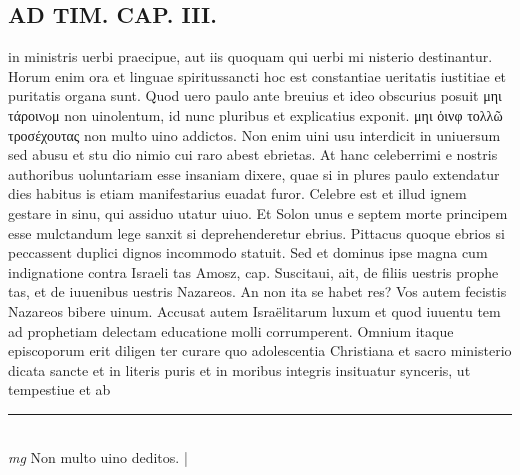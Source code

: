 \documentclass{article}
\begin{document}
\begin{pages}
\section*{AD TIM. CAP. III. }
\marginpar{[ p.131 ]}\pstart in ministris uerbi praecipue, aut iis quoquam qui uerbi mi nisterio destinantur. Horum enim ora et linguae spiritussancti hoc est constantiae ueritatis iustitiae et puritatis organa sunt. Quod uero paulo ante breuius et ideo obscurius posuit μηι τάροινoμ non uinolentum, id nunc pluribus et explicatius exponit. μηι ὁινφ τολλῶ τροσέχουτας non multo uino addictos. Non enim uini usu interdicit in uniuersum sed abusu et stu dio nimio cui raro abest ebrietas. At hanc celeberrimi e nostris authoribus uoluntariam esse insaniam dixere, quae si in plures paulo extendatur dies habitus is etiam manifestarius euadat furor. Celebre est et illud ignem gestare in sinu, qui assiduo utatur uiuo. Et Solon unus e septem morte principem esse mulctandum lege sanxit si deprehenderetur ebrius. Pittacus quoque ebrios si peccassent duplici dignos incommodo statuit. Sed et dominus ipse magna cum indignatione contra Israeli tas Amosz, cap. Suscitaui, ait, de filiis uestris prophe tas, et de iuuenibus uestris Nazareos. An non ita se habet res? Vos autem fecistis Nazareos bibere uinum. Accusat autem Israëlitarum luxum et quod iuuentu tem ad prophetiam delectam educatione molli corrumperent. Omnium itaque episcoporum erit diligen ter curare quo adolescentia Christiana et sacro ministerio dicata sancte et in literis puris et in moribus integris insituatur synceris, ut tempestiue et ab  \pend
\vspace{0.5cm}\noindent
\vspace{0.2cm}\rule{1cm}{0.2pt}\\ 
\hspace{0.2cm}\textit{mg}
\footnotesize Non multo uino deditos. 
\normalsize| 

\end{pages}
\end{document}
